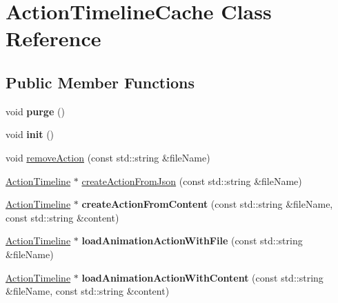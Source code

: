 \hypertarget{classActionTimelineCache}{}\section{Action\+Timeline\+Cache Class Reference}
\label{classActionTimelineCache}
\subsection*{Public Member Functions}
\begin{DoxyCompactItemize}
\item 
\mbox{\label{classActionTimelineCache_ab3ebdb24012a514be6f0651ef980f556}} 
void {\bfseries purge} ()
\item 
\mbox{\label{classActionTimelineCache_a1d478369c10f7f3bed633bc5e7e97eb4}} 
void {\bfseries init} ()
\item 
void \hyperlink{classActionTimelineCache_ac4308862e347ec5cb1459c29f8b8d012}{remove\+Action} (const std\+::string \&file\+Name)
\item 
\hyperlink{classActionTimeline}{Action\+Timeline} $\ast$ \hyperlink{classActionTimelineCache_a93cfb036b5aa2614f357f088aa82dc45}{create\+Action\+From\+Json} (const std\+::string \&file\+Name)
\item 
\mbox{\label{classActionTimelineCache_aad7982f08eb4e61535ac7a371a3a22e4}} 
\hyperlink{classActionTimeline}{Action\+Timeline} $\ast$ {\bfseries create\+Action\+From\+Content} (const std\+::string \&file\+Name, const std\+::string \&content)
\item 
\mbox{\label{classActionTimelineCache_adb7948e857a202aabd7484474ae174d7}} 
\hyperlink{classActionTimeline}{Action\+Timeline} $\ast$ {\bfseries load\+Animation\+Action\+With\+File} (const std\+::string \&file\+Name)
\item 
\mbox{\label{classActionTimelineCache_aaa099c0320b31df97c8ee0201e28a44e}} 
\hyperlink{classActionTimeline}{Action\+Timeline} $\ast$ {\bfseries load\+Animation\+Action\+With\+Content} (const std\+::string \&file\+Name, const std\+::string \&content)
\item 
\mbox{\label{classActionTimelineCache_a92bbc89b59890c01f34beff9e5c5ed69}} 

\end{DoxyCompactItemize}
